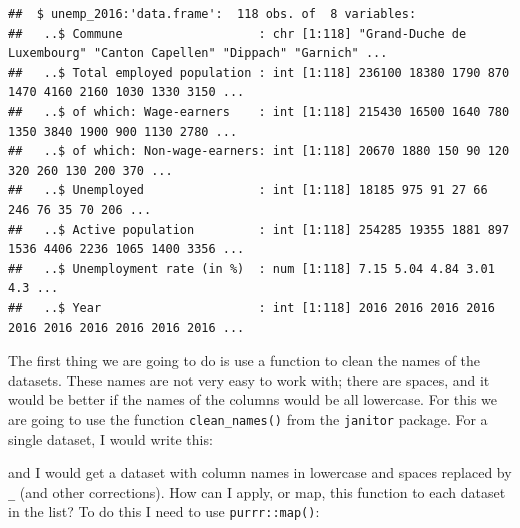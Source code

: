 \documentclass[]{gitbook}
\newenvironment{Shaded}{\begin{snugshade}}{\end{snugshade}}
\newcommand{\KeywordTok}[1]{\textcolor[rgb]{0.13,0.29,0.53}{\textbf{#1}}}
\newcommand{\NormalTok}[1]{#1}
\newcommand{\OperatorTok}[1]{\textcolor[rgb]{0.81,0.36,0.00}{\textbf{#1}}}
\newcommand{\StringTok}[1]{\textcolor[rgb]{0.31,0.60,0.02}{#1}}
\begin{document}
\begin{verbatim}
##  $ unemp_2016:'data.frame':  118 obs. of  8 variables:
##   ..$ Commune                   : chr [1:118] "Grand-Duche de Luxembourg" "Canton Capellen" "Dippach" "Garnich" ...
##   ..$ Total employed population : int [1:118] 236100 18380 1790 870 1470 4160 2160 1030 1330 3150 ...
##   ..$ of which: Wage-earners    : int [1:118] 215430 16500 1640 780 1350 3840 1900 900 1130 2780 ...
##   ..$ of which: Non-wage-earners: int [1:118] 20670 1880 150 90 120 320 260 130 200 370 ...
##   ..$ Unemployed                : int [1:118] 18185 975 91 27 66 246 76 35 70 206 ...
##   ..$ Active population         : int [1:118] 254285 19355 1881 897 1536 4406 2236 1065 1400 3356 ...
##   ..$ Unemployment rate (in %)  : num [1:118] 7.15 5.04 4.84 3.01 4.3 ...
##   ..$ Year                      : int [1:118] 2016 2016 2016 2016 2016 2016 2016 2016 2016 2016 ...
\end{verbatim}

The first thing we are going to do is use a function to clean the names of the datasets. These
names are not very easy to work with; there are spaces, and it would be better if the names of the
columns would be all lowercase. For this we are going to use the function \texttt{clean\_names()} from the
\texttt{janitor} package. For a single dataset, I would write this:

\begin{Shaded}
\end{Shaded}

and I would get a dataset with column names in lowercase and spaces replaced by \texttt{\_} (and other
corrections). How can I apply, or map, this function to each dataset in the list? To do this I need
to use \texttt{purrr::map()}:

\begin{Shaded}
\end{Shaded}
\end{document}
